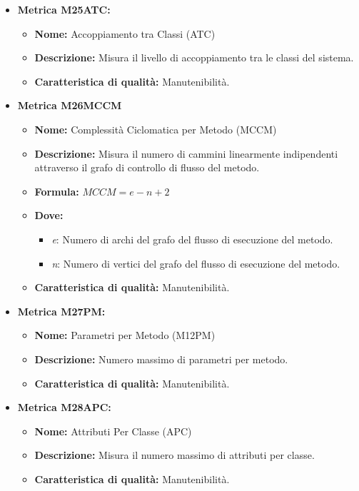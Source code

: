 \begin{itemize}
            \item \textbf{Metrica M25ATC:}
                  \begin{itemize}
                      \item \textbf{Nome:} Accoppiamento tra Classi (ATC)
                      \item \textbf{Descrizione:} Misura il livello di accoppiamento tra le classi del sistema.
                      \item \textbf{Caratteristica di qualità:} Manutenibilità.
                  \end{itemize}

        \item \textbf{Metrica M26MCCM}
            \begin{itemize}
            \item \textbf{Nome:} Complessità Ciclomatica per Metodo (MCCM)
            \item \textbf{Descrizione:} Misura il numero di cammini linearmente indipendenti attraverso il grafo di controllo di flusso del metodo.
            \item \textbf{Formula:} $MCCM = e - n + 2$
            \item \textbf{Dove:}
            \begin{itemize}
                        \item \textit{e}: Numero di archi del grafo del flusso di esecuzione del metodo.
                        \item \textit{n}: Numero di vertici del grafo del flusso di esecuzione del metodo.
            \end{itemize}
            \item \textbf{Caratteristica di qualità:} Manutenibilità.
        \end{itemize}

        \item \textbf{Metrica M27PM:}
        \begin{itemize}
            \item \textbf{Nome:} Parametri per Metodo (M12PM)
            \item \textbf{Descrizione:} Numero massimo di parametri per metodo.
            \item \textbf{Caratteristica di qualità:} Manutenibilità.
          \end{itemize}

        \item \textbf{Metrica M28APC:}
          \begin{itemize}
              \item \textbf{Nome:} Attributi Per Classe (APC)
              \item \textbf{Descrizione:} Misura il numero massimo di attributi per classe.
              \item \textbf{Caratteristica di qualità:} Manutenibilità.
          \end{itemize} 


\end{itemize}
